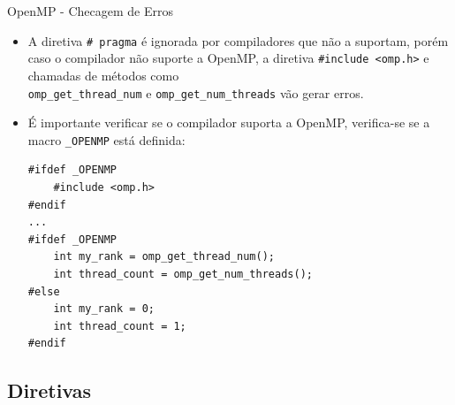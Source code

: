 \begin{frame}[fragile]{OpenMP - Checagem de Erros}
	\begin{itemize}
		\item A diretiva \texttt{\# pragma} é ignorada por compiladores que não a suportam, porém caso o compilador não suporte a OpenMP, a diretiva \texttt{\#include <omp.h>} e chamadas de métodos como\\ \texttt{omp\_get\_thread\_num} e \texttt{omp\_get\_num\_threads} vão gerar erros.
		\pause
		\medskip
		\item É importante verificar se o compilador suporta a OpenMP, verifica-se se a macro \texttt{\_OPENMP} está definida:
		\fontsize{8pt}{7.2}\selectfont
\begin{lstlisting}
#ifdef _OPENMP
    #include <omp.h>
#endif
...
#ifdef _OPENMP
    int my_rank = omp_get_thread_num();
    int thread_count = omp_get_num_threads();
#else
    int my_rank = 0;
    int thread_count = 1;
#endif
\end{lstlisting}
\fontsize{10pt}{7.2}\selectfont
	\end{itemize}
\end{frame}

\subsection{Diretivas}


